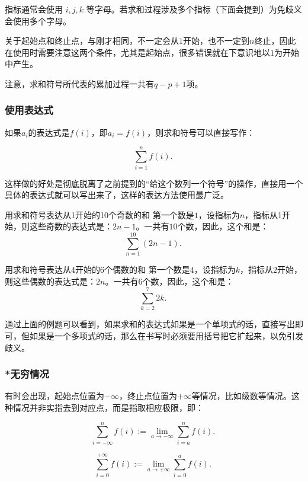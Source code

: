 指标通常会使用 $i,j,k$ 等字母。若求和过程涉及多个指标（下面会提到）为免歧义会使用多个字母。

关于起始点和终止点，与刚才相同，不一定会从$1$开始，也不一定到$n$终止，因此在使用时需要注意这两个条件，尤其是起始点，很多错误就在下意识地以$1$为开始中产生。

注意，求和符号所代表的累加过程一共有$q-p+1$项。

\subsubsection{使用表达式}

如果$a_i$的表达式是$f(i)$，即$a_i=f(i)$，则求和符号可以直接写作：

\begin{equation}
\sum_{i=1}^n f(i) .~
\end{equation}

这样做的好处是彻底脱离了之前提到的“给这个数列一个符号”的操作，直接用一个具体的表达式就可以写出来了，这样的表达方法使用最广泛。

\begin{example}{用求和符号表达从1开始的10个奇数的和}
第一个数是$1$，设指标为$n$，指标从1开始，则这些奇数的表达式是：$2n-1$。一共有$10$个数，因此，这个和是：
$$\sum_{n=1}^{10}(2n-1).~$$
\end{example}

\begin{example}{用求和符号表达从4开始的6个偶数的和}
第一个数是$4$，设指标为$k$，指标从$2$开始，则这些偶数的表达式是：$2n$。一共有$6$个数，因此，这个和是：
$$\sum_{k=2}^{7}{2k} .~$$
\end{example}

通过上面的例题可以看到，如果求和的表达式如果是一个单项式的话，直接写出即可，但如果是一个多项式的话，那么在书写时必须要用括号把它扩起来，以免引发歧义。

\subsubsection{*无穷情况}

有时会出现，起始点位置为$-\infty$，终止点位置为$+\infty$等情况，比如级数等情况。这种情况并非实指去到对应点，而是指取相应极限，即：

\begin{equation}
\sum_{i=-\infty}^n f(i):= \lim_{a\to-\infty}\sum_{i=a}^n f(i).~
\end{equation}

\begin{equation}
\sum_{i=0}^{+\infty} f(i):= \lim_{a\to+\infty}\sum_{i=0}^a f(i).~
\end{equation}

